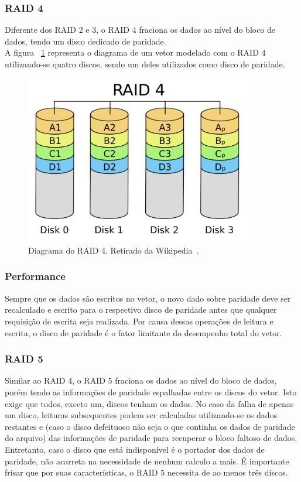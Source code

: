 		\subsubsection{RAID 4}
		Diferente dos RAID 2 e 3, o RAID 4 fraciona os dados ao nível do bloco de dados, tendo um disco dedicado de paridade. \\
		
		A figura ~\ref{fig:raid4} representa o diagrama de um vetor modelado com o RAID 4 utilizando-se quatro discos, sendo um deles utilizados como disco de paridade.\\
		
		\begin{figure}[htb]
			\begin{center}
				
				\includegraphics[clip,width=10.0cm]{images/RAID_4.png}
				\caption{Diagrama do RAID 4. Retirado da Wikipedia~\citep{wikiRAIDlevels}.}
				\label{fig:raid4}
			\end{center}
		\end{figure} 
		
		\subsubsection{Performance}
		Sempre que os dados são escritos no vetor, o novo dado sobre paridade deve ser recalculado e escrito para o respectivo disco de paridade antes que qualquer requisição de escrita seja realizada. Por causa dessas operações de leitura e escrita, o disco de paridade é o fator limitante do desempenho total do vetor.\\
		
		\subsubsection{RAID 5}
		Similar ao RAID 4, o RAID 5 fraciona os dados ao nível do bloco de dados, porém tendo as informações de paridade espalhadas entre os discos do vetor. Isto exige que todos, exceto um, discos tenham os dados. No caso da falha de apenas um disco, leituras subsequentes podem ser calculadas utilizando-se os dados restantes e (caso o disco defeituoso não seja o que continha os dados de paridade do arquivo) das informações de paridade para recuperar o bloco faltoso de dados. Entretanto, caso o disco que está indisponível é o portador dos dados de paridade, não acarreta na necessidade de nenhum calculo a mais. É importante frisar que por suas características, o RAID 5 necessita de ao menos três discos.  \\
		
